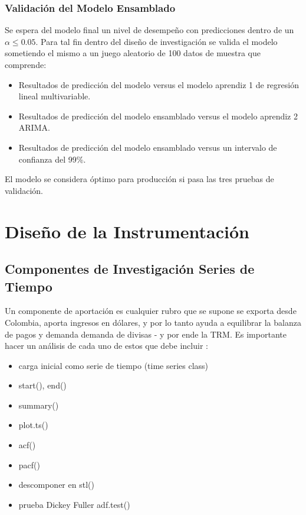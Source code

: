 \subsubsection{Validación del Modelo Ensamblado}
Se espera del modelo final un nivel de desempeño con predicciones dentro de un \(\alpha \leq 0.05\). Para tal fin dentro del diseño de investigación se valida el modelo sometiendo el mismo a un juego aleatorio de 100 datos de muestra que comprende:

\begin{itemize}
	\item Resultados de predicción del modelo versus el modelo aprendiz 1 de regresión lineal multivariable.
	\item Resultados de predicción del modelo ensamblado versus el modelo aprendiz 2 ARIMA. 
	\item Resultados de predicción del modelo ensamblado versus un intervalo de confianza del 99\%.
\end{itemize}

El modelo se considera óptimo para producción si pasa las tres pruebas de validación.  

\section{Diseño de la Instrumentación}
\subsection{Componentes de Investigación Series de Tiempo}
Un componente de aportación es cualquier rubro que se supone se exporta desde Colombia, aporta ingresos en dólares, y por lo tanto ayuda a equilibrar la balanza de pagos y demanda demanda de divisas - y por ende la TRM. Es importante hacer un análisis de cada uno de estos que debe incluir \cite{zumelMount}:

\begin{itemize}
	\item carga inicial como serie de tiempo (time series class)
	\item start(), end()
    \item summary()
    \item plot.ts()
    \item acf()
    \item pacf()
    \item descomponer en stl()
    \item prueba Dickey Fuller adf.test()
\end{itemize}

